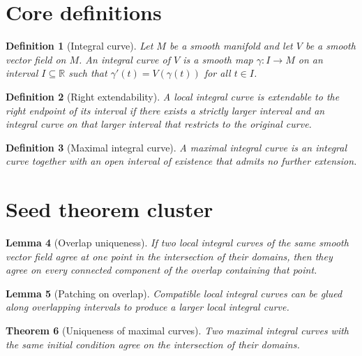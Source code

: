 \documentclass[11pt]{article}
\newtheorem{definition}{Definition}[section]
\newtheorem{lemma}[definition]{Lemma}
\newtheorem{theorem}[definition]{Theorem}
\begin{document}
\section{Core definitions}

\begin{definition}[Integral curve]\label{def:integral-curve}
Let $M$ be a smooth manifold and let $V$ be a smooth vector field on $M$. An
integral curve of $V$ is a smooth map $\gamma : I \to M$ on an interval
$I \subseteq \mathbb{R}$ such that $\gamma'(t) = V(\gamma(t))$ for all
$t \in I$.
\end{definition}

\begin{definition}[Right extendability]\label{def:right-extendability}
A local integral curve is extendable to the right endpoint of its interval if
there exists a strictly larger interval and an integral curve on that larger
interval that restricts to the original curve.
\end{definition}

\begin{definition}[Maximal integral curve]\label{def:maximal-integral-curve}
A maximal integral curve is an integral curve together with an open interval of
existence that admits no further extension.
\end{definition}

\section{Seed theorem cluster}

\begin{lemma}[Overlap uniqueness]\label{lem:overlap-uniqueness}
If two local integral curves of the same smooth vector field agree at one point
in the intersection of their domains, then they agree on every connected
component of the overlap containing that point.
\end{lemma}

\begin{lemma}[Patching on overlap]\label{lem:patching-on-overlap}
Compatible local integral curves can be glued along overlapping intervals to
produce a larger local integral curve.
\end{lemma}

\begin{theorem}[Uniqueness of maximal curves]\label{thm:uniqueness-of-maximal-curves}
Two maximal integral curves with the same initial condition agree on the
intersection of their domains.
\end{theorem}
\end{document}
